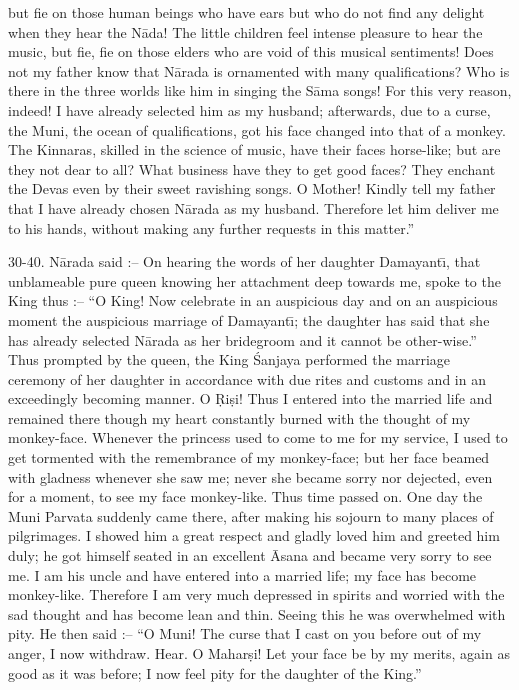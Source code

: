 but fie on those human beings who have ears but who do not find any delight when they hear the N\=ada! The little children feel intense pleasure to hear the music, but fie, fie on those elders who are void of this musical sentiments! Does not my father know that N\=arada is ornamented with many qualifications? Who is there in the three worlds like him in singing the S\=ama songs! For this very reason, indeed! I have already selected him as my husband; afterwards, due to a curse, the Muni, the ocean of qualifications, got his face changed into that of a monkey. The Kinnaras, skilled in the science of music, have their faces horse-like; but are they not dear to all? What business have they to get good faces? They enchant the Devas even by their sweet ravishing songs. O Mother! Kindly tell my father that I have already chosen N\=arada as my husband. Therefore let him deliver me to his hands, without making any further requests in this matter.''

30-40. N\=arada said :-- On hearing the words of her daughter Damayant\={\i}, that unblameable pure queen knowing her attachment deep towards me, spoke to the King thus :-- ``O King! Now celebrate in an auspicious day and on an auspicious moment the auspicious marriage of Damayant\={\i}; the daughter has said that she has already selected N\=arada as her bridegroom and it cannot be other-wise.'' Thus prompted by the queen, the King \'Sanjaya performed the marriage ceremony of her daughter in accordance with due rites and customs and in an exceedingly becoming manner. O \d{R}i\d{s}i! Thus I entered into the married life and remained there though my heart constantly burned with the thought of my monkey-face. Whenever the princess used to come to me for my service, I used to get tormented with the remembrance of my monkey-face; but her face beamed with gladness whenever she saw me; never she became sorry nor dejected, even for a moment, to see my face monkey-like. Thus time passed on. One day the Muni Parvata suddenly came there, after making his sojourn to many places of pilgrimages. I showed him a great respect and gladly loved him and greeted him duly; he got himself seated in an excellent \=Asana and became very sorry to see me. I am his uncle and have entered into a married life; my face has become monkey-like. Therefore I am very much depressed in spirits and worried with the sad thought and has become lean and thin. Seeing this he was overwhelmed with pity. He then said :-- ``O Muni! The curse that I cast on you before out of my anger, I now withdraw. Hear. O Mahar\d{s}i! Let your face be by my merits, again as good as it was before; I now feel pity for the daughter of the King.''

